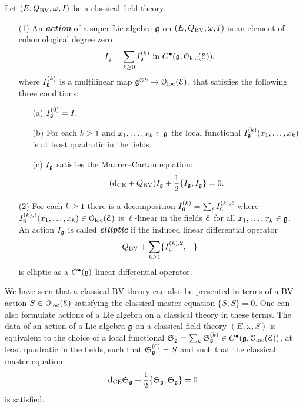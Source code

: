 \documentclass[10pt, oneside]{article}
\newcommand{\defterm}[1]{\textbf{\emph{#1}}}
\begin{document}
\begin{definition}
\label{infinitesimal_action_def}
Let $(E, Q_{\mathrm{BV}},\omega, I)$ be a classical field theory. 
\begin{itemize}
\item[(1)]
An \defterm{action} of a super Lie algebra $\mathfrak g$ on $(E, Q_{\mathrm{BV}}, \omega, I)$ is an element of cohomological degree zero 
\[I_\mathfrak g = \sum_{k\geq 0} I_{\mathfrak g}^{(k)} \text{ in } C^\bullet(\mathfrak g, \mathcal{O}_{\rm loc}(\mathcal E)),\]
where $I_\mathfrak g^{(k)}$ is a multilinear map $\mathfrak g^{\otimes k} \to \mathcal{O}_{\rm loc}(\mathcal E)$, that satisfies the following three conditions:
\begin{itemize}
\item[(a)] $I_\mathfrak g^{(0)} = I$.
\item[(b)] For each $k \geq 1$ and $x_1, \ldots, x_k \in \mathfrak g$ the local functional $I^{(k)}_\mathfrak g (x_1,\ldots, x_k)$ is at least quadratic in the fields.
\item[(c)] $I_\mathfrak g$ satisfies the Maurer--Cartan equation:
\[({\rm d}_{\mathrm{CE}} + Q_{\mathrm{BV}}) I_\mathfrak g + \frac{1}{2} \{I_\mathfrak g, I_\mathfrak g\} = 0.\]
\end{itemize}
\item[(2)]
For each $k \geq 1$ there is a decomposition $I_\mathfrak g^{(k)} = \sum_{\ell} I_\mathfrak g^{(k),\ell}$ where $ I_\mathfrak g^{(k),\ell}(x_1,\ldots,x_k) \in \mathcal{O}_{\rm loc}(\mathcal E)$ is $\ell$-linear in the fields $\mathcal E$ for all $x_1,\ldots,x_k \in \mathfrak g$.
An action $I_\mathfrak g$ is called \defterm{elliptic} if the induced linear differential operator
\[
Q_{\mathrm{BV}} + \sum_{k \geq 1} \{I_\mathfrak g^{(k),2}, -\}
\]
is elliptic as a $C^\bullet(\mathfrak g)$-linear differential operator.
\end{itemize}
\end{definition}

\begin{remark}
\end{remark}

\begin{remark}
We have seen that a classical BV theory can also be presented in terms of a BV action $S \in \mathcal{O}_{\rm loc}(\mathcal E)$ satisfying the classical master equation $\{S, S\} = 0$. 
One can also formulate actions of a Lie algebra on a classical theory in these terms. 
The data of an action of a Lie algebra $\mathfrak g$ on a classical field theory $(E, \omega, S)$ is equivalent to the choice of a local functional $\mathfrak S_\mathfrak g = \sum_k \mathfrak S_\mathfrak g^{(k)}\in C^\bullet(\mathfrak g, \mathcal{O}_{\rm loc}(\mathcal E))$, at least quadratic in the fields, such that $\mathfrak S^{(0)}_\mathfrak g = S$ and such that the classical master equation
\[
{\rm d}_{\mathrm{CE}} \mathfrak S_\mathfrak g + \frac{1}{2} \{\mathfrak S_\mathfrak g, \mathfrak S_\mathfrak g\} = 0 
\]
is satisfied.
\end{remark}
\end{document}
